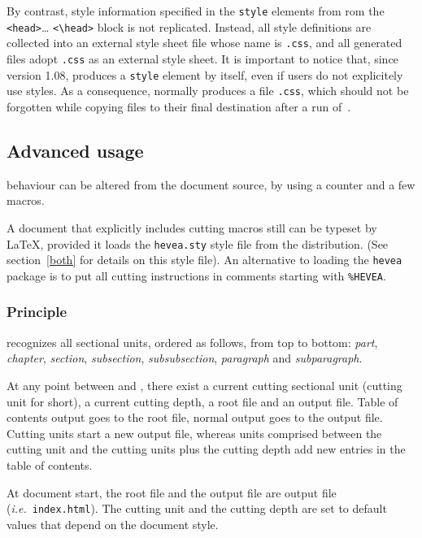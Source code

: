 \label{hacha:style}%
By contrast, style information specified in the \verb+style+ elements
from rom the \verb+<head>+\ldots{} \verb+<\head>+
block is not replicated. Instead, all style definitions are collected into an
external style sheet file whose name is \texttt{.css},
and all generated {\html} files adopt \texttt{.css} as
an external style sheet.
It is important to notice that, since version 1.08, \hevea{} produces
a \verb+style+ element by itself, even if users do not explicitely
use styles. As a consequence,
\hacha{} normally produces a
file \texttt{.css}, which should not be forgotten while
copying files to their final destination after a run of~\hacha.

\subsection{Advanced usage}

\hacha{} behaviour can be altered from the document source, by using
a counter and a few macros.

A document that explicitly includes cutting macros still can be typeset by
\LaTeX{}, provided it loads the
\texttt{hevea.sty} style file from the \hevea{} distribution.
(See section~\ref{both} for details on this style file).
An alternative to loading the \texttt{hevea} package is to put
all cutting instructions in comments starting with \verb+%HEVEA+.



\subsubsection{Principle}
{\hacha} recognizes all sectional units, ordered as follows, from
top to bottom: {\em
part}, {\em chapter},
{\em section}, {\em subsection}, {\em subsubsection},
\emph{paragraph} and \emph{subparagraph}.

At any point between \verb++ and
\verb++,
there exist a current cutting sectional unit (cutting unit for short),
a current cutting depth, a root file and an output file.
Table of contents output goes to the root file, normal output goes to
the output file.
Cutting units start a new output file, whereas units comprised between the
cutting unit and the cutting units plus the cutting depth add new
entries in the table of contents.

At document start, the root file and the output file are {\hacha}
output file (\emph{i.e.}\ \texttt{index.html}).
The cutting unit and the cutting depth are set to default values that
depend on the document style.

